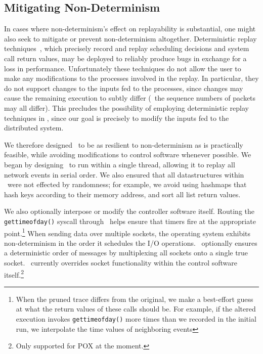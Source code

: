 \subsection{Mitigating Non-Determinism}

In cases where non-determinism's effect on replayability is substantial,
one might also seek to mitigate or prevent non-determinism altogether.
Deterministic replay techniques~\cite{Dunlap:2002:REI:844128.844148,Geels:2006:RDD:1267359.1267386},
which precisely record and replay scheduling decisions and system call return values,
may be deployed to reliably produce bugs in exchange for a loss in performance.
Unfortunately these techniques do not allow the user to make any modifications to the processes
involved in the replay. In particular, they do not support changes to the inputs fed to the
processes, since changes may cause the remaining execution to
subtly differ (\eg~the sequence numbers of packets may all differ).
This precludes the possibility of employing deterministic replay techniques in
\projectname, since our goal is precisely to modify the inputs fed to the
distributed system.

We therefore designed \projectname~to be as resilient to non-determinism as is
practically feasible, while avoiding modifications to control software whenever possible.
We began by designing \projectname~to run within a single thread, allowing it
to replay all network events in serial order. We also ensured that all
datastructures within \projectname~were not effected by randomness; for example,
we avoid using hashmaps that hash keys according to their memory address,
and sort all list return values.

We also optionally interpose or modify the controller software itself.
Routing the {\tt gettimeofday()} syscall through \projectname~helps ensure that timers fire
at the appropriate point.\footnote{When the pruned trace differs from the original, we make a
best-effort guess at what the return values of these calls should be. For example,
if the altered execution invokes {\tt gettimeofday()} more times than we recorded
in the initial run, we interpolate the time values of neighboring events}
When sending data over multiple sockets, the operating system exhibits
non-determinism in the order it schedules the I/O operations.
\projectname~optionally ensures a deterministic order of messages
by multiplexing all sockets
onto a single true socket. \projectname~currently overrides socket functionality within the control
software itself.\footnote{Only supported for POX at the moment.}

